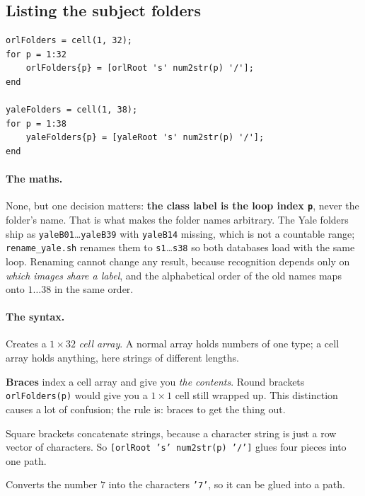\subsection{Listing the subject folders}

\begin{lstlisting}
orlFolders = cell(1, 32);
for p = 1:32
    orlFolders{p} = [orlRoot 's' num2str(p) '/'];
end

yaleFolders = cell(1, 38);
for p = 1:38
    yaleFolders{p} = [yaleRoot 's' num2str(p) '/'];
end
\end{lstlisting}

\paragraph{The maths.} None, but one decision matters: \textbf{the class label
is the loop index \texttt{p}}, never the folder's name. That is what makes the
folder names arbitrary. The Yale folders ship as
\texttt{yaleB01}\ldots\texttt{yaleB39} with \texttt{yaleB14} missing, which is
not a countable range; \texttt{rename\_yale.sh} renames them to
\texttt{s1}\ldots\texttt{s38} so both databases load with the same loop.
Renaming cannot change any result, because recognition depends only on
\emph{which images share a label}, and the alphabetical order of the old names
maps onto $1\ldots38$ in the same order.

\paragraph{The syntax.}
\begin{description}[leftmargin=*,style=nextline,nosep]
\item[\texttt{cell(1,32)}] Creates a $1\times32$ \emph{cell array}. A normal
  array holds numbers of one type; a cell array holds anything, here strings of
  different lengths.
\item[\texttt{orlFolders\{p\}}] \textbf{Braces} index a cell array and give you
  \emph{the contents}. Round brackets \texttt{orlFolders(p)} would give you a
  $1\times1$ cell still wrapped up. This distinction causes a lot of confusion;
  the rule is: braces to get the thing out.
\item[\texttt{['abc' 'def']}] Square brackets concatenate strings, because a
  character string is just a row vector of characters. So
  \texttt{[orlRoot 's' num2str(p) '/']} glues four pieces into one path.
\item[\texttt{num2str(p)}] Converts the number $7$ into the characters
  \texttt{'7'}, so it can be glued into a path.
\end{description}

